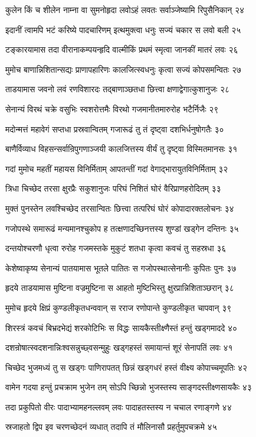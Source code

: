कुलेन किं च शीलेन नाम्ना वा सुमनोहृदा
लवोऽहं लवतः सर्वाञ्जेष्यामि रिपुसैनिकान् २४

इदानीं त्वामपि भटं करिष्ये पादचारिणम्
इत्थमुक्त्वा धनुः सज्यं चकार स लवो बली २५

टङ्कारयामास तदा वीरानाकम्पयन्हृदि
वाल्मीकिं प्रथमं स्मृत्वा जानकीं मातरं लवः २६

मुमोच बाणान्निशितान्सद्यः प्राणापहारिणः
कालजित्स्वधनुः कृत्वा सज्यं कोपसमन्वितः २७

ताडयामास जवनो लवं रणविशारदः
तद्बाणाञ्छतधा छित्त्वा क्षणाद्वेगात्कुशानुजः २८

सेनान्यं विरथं चक्रे वसुभिः स्वशरोत्तमैः
विरथो गजमानीतमारुरोह भटैर्निजैः २९

मदोन्मत्तं महावेगं सप्तधा प्रस्रवान्वितम्
गजारूढं तु तं दृष्ट्वा दशभिर्धनुषोगतैः ३०

बाणैर्विव्याध विहसन्सर्वान्रिपुगणाञ्जयी
कालजित्तस्य वीर्यं तु दृष्ट्वा विस्मितमानसः ३१

गदां मुमोच महतीं महायस विनिर्मिताम्
आपतन्तीं गदां वेगाद्भारायुतविनिर्मिताम् ३२

त्रिधा चिच्छेद तरसा क्षुरप्रैः सकुशानुजः
परिघं निशितं घोरं वैरिप्राणहरोदितम् ३३

मुक्तं पुनस्तेन लवश्चिच्छेद तरसान्वितः
छित्त्वा तत्परिघं घोरं कोपादारक्तलोचनः ३४

गजोपस्थे समारूढं मन्यमानश्चुकोप ह
तत्क्षणादच्छिनत्तस्य शुण्डां खड्गेन दन्तिनः ३५

दन्तयोश्चरणौ धृत्वा रुरोह गजमस्तके
मुकुटं शतधा कृत्वा कवचं तु सहस्रधा ३६

केशेष्वाकृष्य सेनान्यं पातयामास भूतले
पातितः स गजोपस्थात्सेनानीः कुपितः पुनः ३७

हृदये ताडयामास मुष्टिना वज्रमुष्टिना
स आहतो मुष्टिभिस्तु क्षुरप्रान्निशिताञ्छरान् ३८

मुमोच हृदये क्षिप्रं कुण्डलीकृतधन्ववान्
स रराज रणोपान्ते कुण्डलीकृत चापवान् ३९

शिरस्त्रं कवचं बिभ्रदभेद्यं शरकोटिभिः
स विद्धः सायकैस्तीक्ष्णैस्तं हन्तुं खड्गमाददे ४०

दशन्रोषात्स्वदशनान्निःश्वसन्नुच्छ्वसन्मुहुः
खड्गहस्तं समायान्तं शूरं सेनापतिं लवः ४१

चिच्छेद भुजमध्यं तु स खड्गः पाणिरापतत्
छिन्नं खड्गधरं हस्तं वीक्ष्य कोपाच्चमूपतिः ४२

वामेन गदया हन्तुं प्रचक्राम भुजेन तम्
सोऽपि च्छिन्नो भुजस्तस्य साङ्गदस्तीक्ष्णसायकैः ४३

तदा प्रकुपितो वीरः पादाभ्यामहनल्लवम्
लवः पादाहतस्तस्य न चचाल रणाङ्गणे ४४

स्रजाहतो द्विप इव चरणच्छेदनं व्यधात्
तदापि तं मौलिनासौ प्रहर्तुमुपचक्रमे ४५

